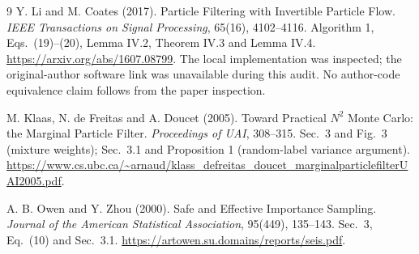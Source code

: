 \documentclass[11pt]{article}
\begin{document}
\begin{thebibliography}{9}
Y. Li and M. Coates (2017).
Particle Filtering with Invertible Particle Flow.
\emph{IEEE Transactions on Signal Processing}, 65(16), 4102--4116.
Algorithm 1, Eqs.~(19)--(20), Lemma IV.2, Theorem IV.3 and Lemma IV.4.
\url{https://arxiv.org/abs/1607.08799}.
The local implementation was inspected; the original-author software
link was unavailable during this audit. No author-code equivalence
claim follows from the paper inspection.

M. Klaas, N. de Freitas and A. Doucet (2005).
Toward Practical $N^2$ Monte Carlo: the Marginal Particle Filter.
\emph{Proceedings of UAI}, 308--315.
Sec.~3 and Fig.~3 (mixture weights); Sec.~3.1 and Proposition 1
(random-label variance argument).
\url{https://www.cs.ubc.ca/~arnaud/klass_defreitas_doucet_marginalparticlefilterUAI2005.pdf}.

A. B. Owen and Y. Zhou (2000).
Safe and Effective Importance Sampling.
\emph{Journal of the American Statistical Association}, 95(449), 135--143.
Sec.~3, Eq.~(10) and Sec.~3.1.
\url{https://artowen.su.domains/reports/seis.pdf}.
\end{thebibliography}
\end{document}

